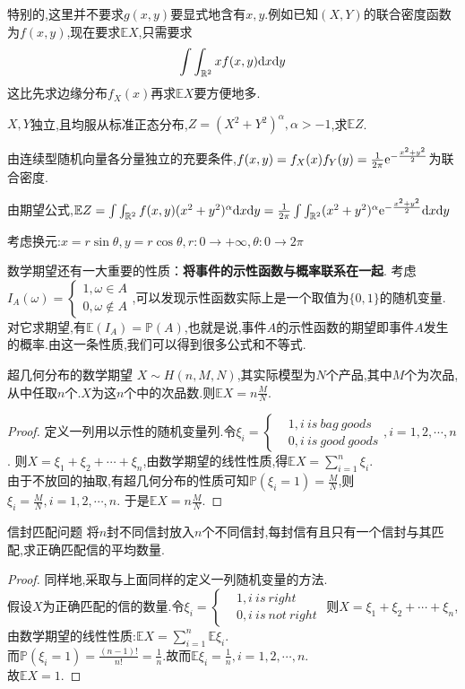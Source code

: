 特别的,这里并不要求$g(x,y)$要显式地含有$x,y$.例如已知$(X,Y)$的联合密度函数为$f(x,y)$,现在要求$\mathbb{E}X$,只需要求
$$\int\int_{\mathbb{R}^2}xf(x,y){\rm d}x{\rm d}y$$
这比先求边缘分布$f_X(x)$再求$\mathbb{E}X$要方便地多.
\begin{example}
    $X,Y$独立,且均服从标准正态分布,$Z=(X^2+Y^2)^\alpha,\alpha>-1$,求$\mathbb{E}Z$.
\end{example}
{\fangsong 
    
由连续型随机向量各分量独立的充要条件,$f(x,y)=f_X(x)f_Y(y)=\frac{1}{2\pi}{\rm e}^{-\frac{x^2+y^2}{2}}$为联合密度.

由期望公式,$\mathbb{E}Z=\int\int_{\mathbb{R}^2}f(x,y)(x^2+y^2)^\alpha {\rm d}x{\rm d}y=\frac{1}{2\pi}\int\int_{\mathbb{R}^2}(x^2+y^2)^\alpha {\rm e}^{-\frac{x^2+y^2}{2}}{\rm d}x{\rm d}y$

考虑换元:$x=r\sin\theta,y=r\cos\theta,r:0\to +\infty,\theta:0\to 2\pi $
}
数学期望还有一大重要的性质：\textbf{将事件的示性函数与概率联系在一起}.
考虑$I_A(\omega)=\left\{\begin{aligned}1,\omega\in A\\0,\omega \notin A\end{aligned}\right.$,可以发现示性函数实际上是一个取值为$\{0,1\}$的随机变量.
对它求期望,有$\mathbb{E}(I_A)=\mathbb{P}(A)$,也就是说,事件$A$的示性函数的期望即事件$A$发生的概率.由这一条性质,我们可以得到很多公式和不等式.
\begin{theorem}{超几何分布的数学期望}{}
    $X\sim H(n,M,N)$,其实际模型为$N$个产品,其中$M$个为次品,从中任取$n$个.$X$为这$n$个中的次品数.则$\mathbb{E}X=n\frac{M}{N}$.
\end{theorem}
\begin{proof}
    定义一列用以示性的随机变量列.令$\xi_i=\left\{\begin{aligned}&1,i\ is \ bag \ goods\\ &0,i\ is\ good\ goods\end{aligned}\right.,i=1,2,\cdots,n$.
    则$X=\xi_1+\xi_2+\cdots+\xi_n$,由数学期望的线性性质,得$\mathbb{E}X=\sum_{i=1}^n\xi_i$.\\
    由于不放回的抽取,有超几何分布的性质可知$\mathbb{P}(\xi_i=1)=\frac{M}{N}$,则$\xi_i=\frac{M}{N},i=1,2,\cdots,n$.
    于是$\mathbb{E}X=n\frac{M}{N}$.
\end{proof}
\begin{proposition}{信封匹配问题}{}
    将$n$封不同信封放入$n$个不同信封,每封信有且只有一个信封与其匹配,求正确匹配信的平均数量.
\end{proposition}
\begin{proof}
    同样地,采取与上面同样的定义一列随机变量的方法.\\
    假设$X$为正确匹配的信的数量.令$\xi_i=\left\{\begin{aligned}&1,i\ is\ right\\ &0,i\ is\ not\ right\end{aligned}\right.$
    则$X=\xi_1+\xi_2+\cdots+\xi_n$,由数学期望的线性性质:$\mathbb{E}X=\sum_{i=1}^{n}\mathbb{E}\xi_i$.\\
    而$\mathbb{P}(\xi_i=1)=\frac{(n-1)!}{n!}=\frac{1}{n}$.故而$\mathbb{E}\xi_i=\frac{1}{n},i=1,2,\cdots,n$.\\
    故$\mathbb{E}X=1$.
\end{proof}
